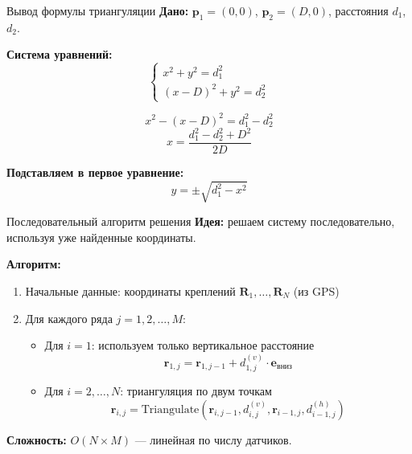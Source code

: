 \documentclass[aspectratio=169, 12pt]{beamer}
\begin{document}
\begin{frame}{Вывод формулы триангуляции}
    \textbf{Дано:} $\mathbf{p}_1 = (0, 0)$, $\mathbf{p}_2 = (D, 0)$, расстояния $d_1$, $d_2$.
    
    \vspace{0.3cm}
    \textbf{Система уравнений:}
    \[
    \begin{cases}
        x^2 + y^2 = d_1^2 \\
        (x - D)^2 + y^2 = d_2^2
    \end{cases}
    \]
    
    \[
    x^2 - (x - D)^2 = d_1^2 - d_2^2
    \]
    \[
    \boxed{x = \frac{d_1^2 - d_2^2 + D^2}{2D}}
    \]
    
    \textbf{Подставляем в первое уравнение:}
    \[
    \boxed{y = \pm\sqrt{d_1^2 - x^2}}
    \]
\end{frame}

\begin{frame}{Последовательный алгоритм решения}
    \textbf{Идея:} решаем систему последовательно, используя уже найденные координаты.
    
    \vspace{0.3cm}
    \textbf{Алгоритм:}
    \begin{enumerate}
        \item Начальные данные: координаты креплений $\mathbf{R}_1, \ldots, \mathbf{R}_N$ (из GPS)
        
        \item Для каждого ряда $j = 1, 2, \ldots, M$:
        \begin{itemize}
            \item Для $i = 1$: используем только вертикальное расстояние
            \[
            \mathbf{r}_{1,j} = \mathbf{r}_{1,j-1} + d_{1,j}^{(v)} \cdot \mathbf{e}_{\text{вниз}}
            \]
            \item Для $i = 2, \ldots, N$: триангуляция по двум точкам
            \[
            \mathbf{r}_{i,j} = \text{Triangulate}(\mathbf{r}_{i,j-1}, d_{i,j}^{(v)}, \mathbf{r}_{i-1,j}, d_{i-1,j}^{(h)})
            \]
        \end{itemize}
    \end{enumerate}
    
    \vspace{0.3cm}
    \textbf{Сложность:} $O(N \times M)$ --- линейная по числу датчиков.
\end{frame}
\end{document}
